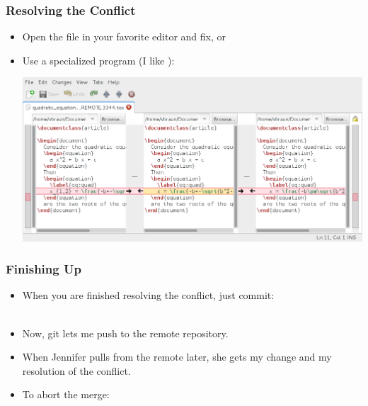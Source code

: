\begin{frame}
  \frametitle{Resolving the Conflict}

  \begin{itemize}
  \item Open the file in your favorite editor and fix, or
  \item Use a specialized program (I like ): \\
    \medskip

    \includegraphics[width=\linewidth]{images/mergetool_meld}
  \end{itemize}
\end{frame}


\begin{frame}
  \frametitle{Finishing Up}

  \begin{itemize}
  \item When you are finished resolving the conflict, just commit:\\
    \\
  \item Now, git lets me push to the remote repository.
  \item When Jennifer pulls from the remote later, she gets my change
    and my resolution of the conflict.
  \item To abort the merge:\\
  \end{itemize}
\end{frame}


{
  \begin{frame}[plain]
  \end{frame}
}


